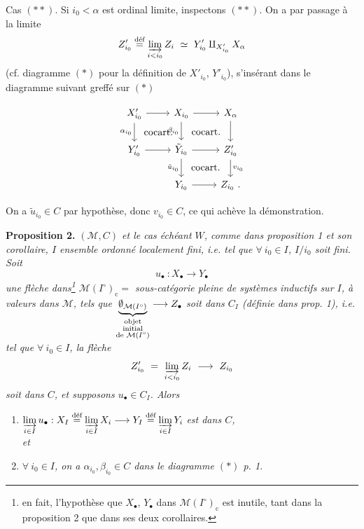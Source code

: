 \documentclass[11pt]{article}
\newcommand{\printedpage}[1]{\marginpar{\footnotesize p.~#1}}
\newcommand{\msp}[1]{\marginpar{\footnotesize [#1]}}
\newcommand{\defeq}{\overset{\textup{déf}}{=}}
\newcommand{\cocart}{\textup{cocart.}}
\begin{document}
Cas $(**)$. Si $i_0 < \alpha$ est ordinal limite, inspectons $(**)$. On a par passage à la limite
\[
Z'_{i_0} \overset{\text{déf}}{=} \varinjlim_{i<i_0} Z_i \ \simeq\ Y'_{i_0} \amalg_{X'_{i_0}} X_\alpha
\]
(cf. diagramme $(*)$ pour la définition de $X'_{i_0}$, $Y'_{i_0}$), s'insérant dans le diagramme suivant greffé sur $(*)$

\setcounter{footnote}{4}

\printedpage{4}

\msp{page 7}

\[
\begin{tikzcd}
X'_{i_0} \arrow[r] \arrow[d, "\alpha_{i_0}"'] \arrow[dr, phantom, "\cocart"] & X_{i_0} \arrow[r] \arrow[d, "\beta_{i_0}"'] \arrow[dr, phantom, "\cocart"] & X_{\alpha} \arrow[d] \\
Y'_{i_0} \arrow[r] & \tilde{Y}_{i_0} \arrow[r] \arrow[d, "\tilde{u}_{i_0}"'] \arrow[dr, phantom, "\cocart"] & Z'_{i_0} \arrow[d, "v_{i_0}"] \\
& Y_{i_0} \arrow[r] & Z_{i_0}\ .
\end{tikzcd}
\]

On a $\tilde{u}_{i_0} \in C$ par hypothèse, donc $v_{i_0} \in C$, ce qui achève la démonstration.

\textbf{Proposition 2.} \textit{$(\mathcal{M}, C)$ et le cas échéant $W$, comme dans proposition 1 et son corollaire, $I$ ensemble ordonné localement fini, i.e. tel que $\forall\ i_0 \in I$, $I/i_0$ soit fini. Soit}
\[
u_{\bullet}\ : X_{\bullet} \longrightarrow Y_{\bullet}
\]
\textit{une flèche dans\footnote{en fait, l'hypothèse que $X_{\bullet}$, $Y_{\bullet}$ dans $\mathcal{M}(I^{\circ})_{\mathrm{c}}$ est inutile, tant dans la proposition 2 que dans ses deux corollaires.} $\mathcal{M}(I^{\circ})_{\mathrm{c}} =$ sous-catégorie pleine de systèmes inductifs sur $I$, à valeurs dans $\mathcal{M}$, tels que $\underbrace{\emptyset_{\mathcal{M}(I^{\circ})}}_{\substack{\textup{objet}\\ \textup{initial}\\ \textup{de } \mathcal{M}(I^{\circ})}} \longrightarrow Z_{\bullet}$ soit dans $C_I$ (définie dans prop. 1), i.e. tel que $\forall\ i_0 \in I$, la flèche}
\[
Z'_{i_0} \ = \ \varinjlim_{i < i_0} Z_i \ \longrightarrow \ Z_{i_0}
\]
\textit{soit dans $C$, et supposons $u_{\bullet} \in C_I$. Alors}
\begin{enumerate}
\item[a)] $\varinjlim\limits_{i \in I} u_{\bullet} : X_I \defeq \varinjlim\limits_{i \in I} X_i \longrightarrow Y_I \defeq \varinjlim\limits_{i \in I} Y_i$ \textit{est dans $C$,}
\msp{page 8}\\
\textit{et}
\item[b)] \textit{$\forall\ i_0 \in I$, on a $\alpha_{i_0}, \beta_{i_0} \in C$ dans le diagramme $(*)$ p. 1.}
\end{enumerate}
\end{document}

